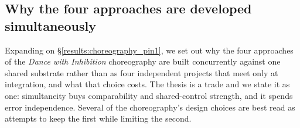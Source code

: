 %

\subsection*{Why the four approaches are developed simultaneously}
\label{supp:simultaneity}

Expanding on \S\ref{results:choreography_pin1}, we set out why the four
approaches of the \emph{Dance with Inhibition} choreography are built
concurrently against one shared substrate rather than as four
independent projects that meet only at integration, and what that
choice costs.
The thesis is a trade and we state it as one: simultaneity buys
comparability and shared-control strength, and it spends error
independence.
Several of the choreography's design choices are best read as attempts
to keep the first while limiting the second.


